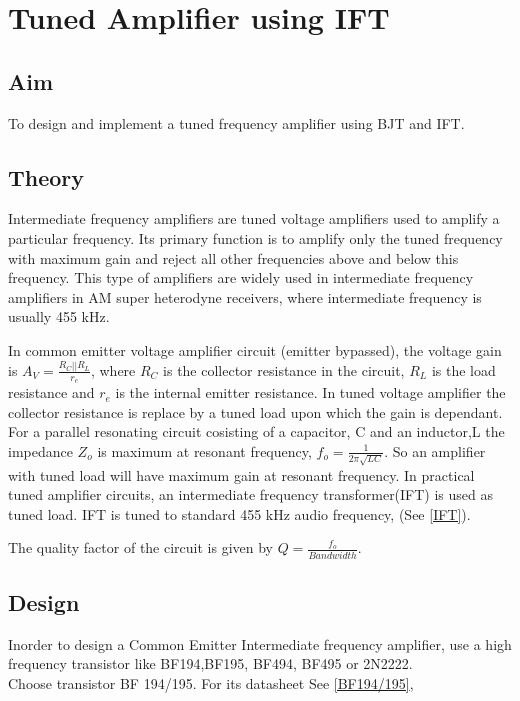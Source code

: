 \chapter[Tuned Amplifier using IFT]{Tuned Amplifier using IFT}
\label{iftamplifier}
\section*{Aim}
To design and implement a tuned frequency amplifier using BJT and IFT.
\section*{Theory}


Intermediate frequency amplifiers are tuned voltage amplifiers used to amplify a particular frequency. Its primary function is to amplify only the tuned frequency with maximum gain and reject all other frequencies above and below this frequency. This type of amplifiers are widely used in intermediate frequency amplifiers in AM super heterodyne receivers, where intermediate frequency is usually 455 kHz.

In common emitter voltage amplifier circuit (emitter bypassed), the voltage gain is $A_V=\frac{R_C||R_L}{r_e}$, where $R_C$ is the collector resistance in the circuit, $R_L$ is the load resistance and $r_e$ is the internal emitter resistance. In tuned voltage amplifier the collector resistance is replace by a tuned load upon which  the gain is dependant. For a parallel resonating circuit cosisting of a capacitor, C and an inductor,L the impedance $Z_o$ is maximum at resonant frequency, $f_o=\frac{1}{2\pi \sqrt{LC}}$. So an amplifier with tuned load will have maximum gain at resonant frequency.
In practical tuned amplifier circuits, an intermediate frequency transformer(IFT) is used as tuned load. IFT is tuned to standard 455 kHz audio frequency, (See \ref{IFT}).

The quality factor of the circuit is given by $Q=\frac{f_o}{Bandwidth}$.

\section*{Design}
Inorder to design a Common Emitter Intermediate frequency amplifier, use a high frequency transistor like BF194,BF195, BF494, BF495 or 2N2222.
\\Choose transistor BF 194/195. For its datasheet See \ref{BF194/195},\\


